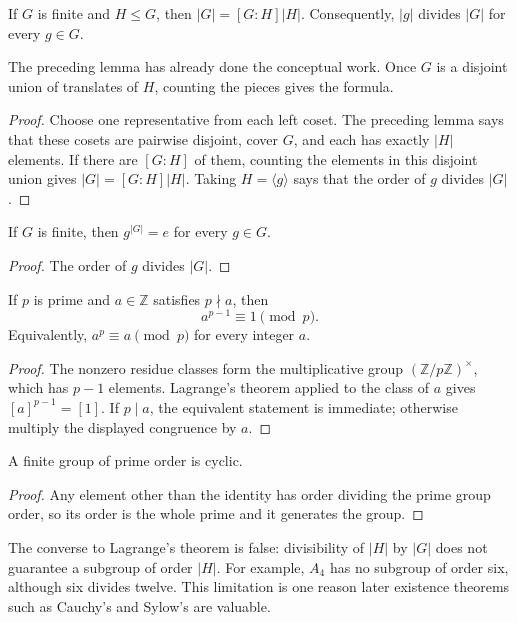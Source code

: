 \begin{theorem}[Lagrange]
If \(G\) is finite and \(H\leq G\), then \(|G|=[G:H]|H|\).  Consequently,
\(|g|\) divides \(|G|\) for every \(g\in G\).
\end{theorem}
\begin{proofidea}
The preceding lemma has already done the conceptual work.  Once \(G\) is a
disjoint union of translates of \(H\), counting the pieces gives the formula.
\end{proofidea}
\begin{proof}
Choose one representative from each left coset.  The preceding lemma says that
these cosets are pairwise disjoint, cover \(G\), and each has exactly \(|H|\)
elements.  If there are \([G:H]\) of them, counting the elements in this
disjoint union gives \(|G|=[G:H]|H|\).  Taking \(H=\langle g\rangle\) says
that the order of \(g\) divides \(|G|\).
\end{proof}

\begin{corollary}
If \(G\) is finite, then \(g^{|G|}=e\) for every \(g\in G\).
\end{corollary}
\begin{proof}
The order of \(g\) divides \(|G|\).
\end{proof}

\begin{theorem}\label{thm:fermat-little}
If \(p\) is prime and \(a\in\mathbb Z\) satisfies \(p\nmid a\), then
\[
a^{p-1}\equiv1\pmod p.
\]
Equivalently, \(a^p\equiv a\pmod p\) for every integer \(a\).
\end{theorem}
\begin{proof}
The nonzero residue classes form the multiplicative group
\((\mathbb Z/p\mathbb Z)^\times\), which has \(p-1\) elements. Lagrange's
theorem applied to the class of \(a\) gives
\([a]^{p-1}=[1]\). If \(p\mid a\), the equivalent statement is immediate;
otherwise multiply the displayed congruence by \(a\).
\end{proof}

\begin{corollary}
A finite group of prime order is cyclic.
\end{corollary}
\begin{proof}
Any element other than the identity has order dividing the prime group order,
so its order is the whole prime and it generates the group.
\end{proof}

The converse to Lagrange's theorem is false: divisibility of \(|H|\) by
\(|G|\) does not guarantee a subgroup of order \(|H|\).  For example, \(A_4\)
has no subgroup of order six, although six divides twelve.  This limitation is
one reason later existence theorems such as Cauchy's and Sylow's are valuable.

